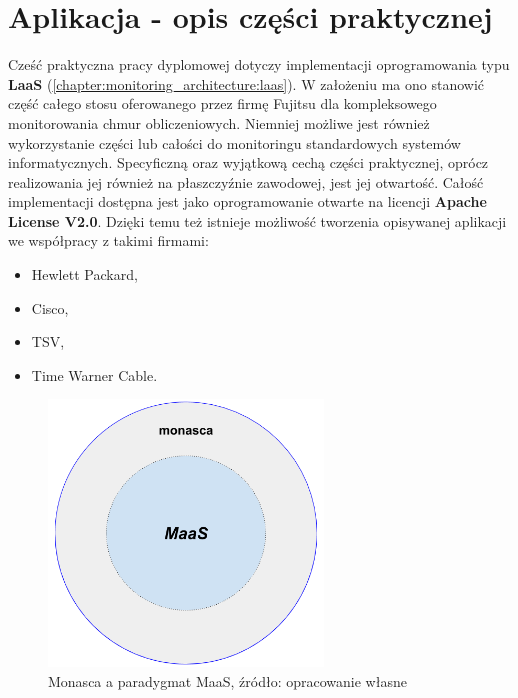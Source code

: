 \chapter{Aplikacja - opis części praktycznej}
\label{chapter:application}


Cześć praktyczna pracy dyplomowej dotyczy implementacji oprogramowania typu \textbf{LaaS} (\ref{chapter:monitoring_architecture:laas}).
W założeniu ma ono stanowić część całego stosu oferowanego przez firmę Fujitsu dla kompleksowego monitorowania chmur obliczeniowych.
Niemniej możliwe jest również wykorzystanie części lub całości do monitoringu standardowych systemów informatycznych. 
Specyficzną oraz wyjątkową cechą części praktycznej, oprócz realizowania jej również na płaszczyźnie zawodowej, jest jej otwartość.
Całość implementacji dostępna jest jako oprogramowanie otwarte na licencji \textbf{Apache License V2.0}. 
Dzięki temu też istnieje możliwość tworzenia opisywanej aplikacji we współpracy z takimi firmami:
\begin{itemize}
    \item Hewlett Packard,
    \item Cisco,
    \item TSV,
    \item Time Warner Cable.
\end{itemize}
    
\begin{figure}[H]
    \centering
    \includegraphics[width=0.65\textwidth]{images/monasca_with_maas}
    \caption[Monasca a paradygmat MaaS]{
        Monasca a paradygmat MaaS, źródło: opracowanie własne
    }
    \label{chapter:application:monasca_and_maas:diagram}
\end{figure}

